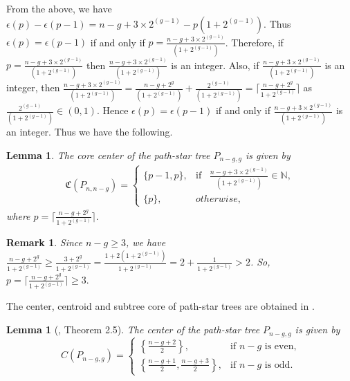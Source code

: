 \documentclass[10pt,a4paper]{amsart}
\newtheorem{lemma}[theorem]{Lemma}
\newtheorem{remark}[theorem]{Remark}
\begin{document}
From the above, we have $ \epsilon(p)-\epsilon(p-1)=n-g+3\times 2^{(g-1)}-p(1+2^{(g-1)})$. Thus 
$\epsilon(p)=\epsilon(p-1)$ if and only if $p=\frac{n-g+3\times 2^{(g-1)}}{(1+2^{(g-1)})}$. Therefore, if $p=\frac{n-g+3\times 2^{(g-1)}}{(1+2^{(g-1)})}$ then $\frac{n-g+3\times 2^{(g-1)}}{(1+2^{(g-1)})}$ is an integer. Also, if $\frac{n-g+3\times 2^{(g-1)}}{(1+2^{(g-1)})}$ is an integer, then $\frac{n-g+3\times2^{(g-1)}}{(1+2^{(g-1)})}=  \frac{n-g+2^{g}}{(1+2^{(g-1)})}+\frac{2^{(g-1)}}{(1+2^{(g-1)})}= \lceil \frac{n-g+2^g}{1+2^{(g-1)}}\rceil$ as $\frac{2^{(g-1)}}{(1+2^{(g-1)})}\in(0,1)$. Hence $\epsilon(p)=\epsilon(p-1)$ if and only if $\frac{n-g+3\times 2^{(g-1)}}{(1+2^{(g-1)})}$ is an integer. Thus we have the following.

\begin{lemma}\label{lem2.1}
The core center of the path-star tree $P_{n-g,g}$ is given by 
\begin{align*}
    \mathfrak{C}(P_{n,n-g})=\begin{cases}
   \{p-1,p\},& \text{if}\;\;\; \frac{n-g+3\times 2^{(g-1)}}{(1+2^{(g-1)})}\in \mathbb{N},\\
   \{p\},& otherwise,
    \end{cases}
\end{align*}
where  $p=\lceil \frac{n-g+2^g}{1+2^{(g-1)}} \rceil.$
\end{lemma}
\begin{remark}\label{rem:p}
Since $n-g\geq 3$, we have $\frac{n-g+2^g}{1+2^{(g-1)}}\geq \frac{3+2^g}{1+2^{(g-1)}}=\frac{1+2(1+2^{(g-1)})}{1+2^{(g-1)}}=2+\frac{1}{1+2^{(g-1)}}>2$. So, $p=\lceil \frac{n-g+2^g}{1+2^{(g-1)}} \rceil\geq 3.$
\end{remark}

The center, centroid and subtree core of path-star trees are obtained in \cite{Des}.
\begin{lemma}[\cite{Des}, Theorem 2.5]\label{lem2.2}
The center of the path-star tree $P_{n-g, g}$ is given by
\begin{equation*}
C(P_{n - g, g}) =
\begin{cases}
\left\{\frac{n - g + 2}{2}\right\}, &\text{if $n - g$ is even,}\\
\left\{\frac{n - g + 1}{2}, \frac{n - g + 3}{2}\right\}, &\text{if $n - g$ is odd.}
\end{cases}
\end{equation*}
\end{lemma}
\end{document}
